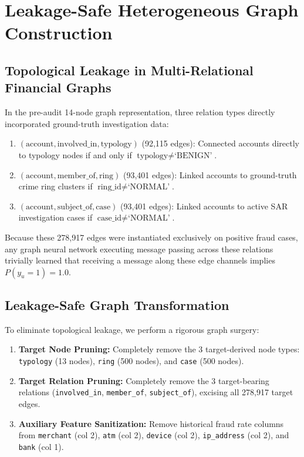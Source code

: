 \section{Leakage-Safe Heterogeneous Graph Construction}
\label{sec:graph}

\subsection{Topological Leakage in Multi-Relational Financial Graphs}
In the pre-audit 14-node graph representation, three relation types directly incorporated ground-truth investigation data:
\begin{enumerate}
    \item $(\text{account}, \text{involved\_in}, \text{typology})$ (92,115 edges): Connected accounts directly to typology nodes if and only if $\text{typology} \neq \text{`BENIGN'}$.
    \item $(\text{account}, \text{member\_of}, \text{ring})$ (93,401 edges): Linked accounts to ground-truth crime ring clusters if $\text{ring\_id} \neq \text{`NORMAL'}$.
    \item $(\text{account}, \text{subject\_of}, \text{case})$ (93,401 edges): Linked accounts to active SAR investigation cases if $\text{case\_id} \neq \text{`NORMAL'}$.
\end{enumerate}

Because these 278,917 edges were instantiated exclusively on positive fraud cases, any graph neural network executing message passing across these relations trivially learned that receiving a message along these edge channels implies $P(y_u = 1) = 1.0$.

\subsection{Leakage-Safe Graph Transformation}
To eliminate topological leakage, we perform a rigorous graph surgery:
\begin{enumerate}
    \item \textbf{Target Node Pruning:} Completely remove the 3 target-derived node types: \texttt{typology} (13 nodes), \texttt{ring} (500 nodes), and \texttt{case} (500 nodes).
    \item \textbf{Target Relation Pruning:} Completely remove the 3 target-bearing relations (\texttt{involved\_in}, \texttt{member\_of}, \texttt{subject\_of}), excising all 278,917 target edges.
    \item \textbf{Auxiliary Feature Sanitization:} Remove historical fraud rate columns from \texttt{merchant} (col 2), \texttt{atm} (col 2), \texttt{device} (col 2), \texttt{ip\_address} (col 2), and \texttt{bank} (col 1).
\end{enumerate}

